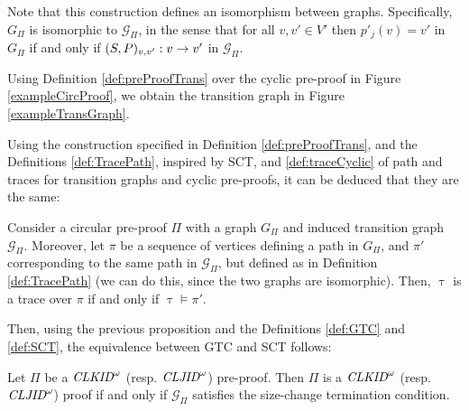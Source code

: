 Note that this construction defines an isomorphism between graphs. Specifically, $G_{\Pi}$ is isomorphic to $\mathcal{G}_{\Pi}$, in the sense that for all $v,v' \in V'$ then $p'_j(v) = v'$ in $G_{\Pi}$ if and only if $(S,P)_{v,v'} : v \to v'$ in $\mathcal{G}_{\Pi}$.




\begin{example}
    Using Definition \ref{def:preProofTrans} over the cyclic pre-proof in Figure \ref{exampleCircProof}, we obtain the transition graph in Figure \ref{exampleTransGraph}. 
\end{example}

Using the construction specified in Definition \ref{def:preProofTrans}, and the Definitions \ref{def:TracePath}, inspired by SCT, and \ref{def:traceCyclic} of path and traces for transition graphs and cyclic pre-proofs, it can be deduced that they are the same:


\begin{proposition}
Consider a circular pre-proof $\Pi$ with a graph $G_{\Pi}$ and induced transition graph $\mathcal{G}_{\Pi}$. Moreover, let $\pi$ be a sequence of vertices defining a path in $G_{\Pi}$, and $\pi'$ corresponding to the same path in $\mathcal{G}_{\Pi}$, but defined as in Definition \ref{def:TracePath} (we can do this, since the two graphs are isomorphic). Then, $\uptau$ is a trace over $\pi$ if and only if $\uptau \models \pi'$.
\end{proposition}

Then, using the previous proposition and the Definitions \ref{def:GTC} and \ref{def:SCT}, the equivalence between GTC and SCT follows:

\begin{proposition}\label{prop:GTC-SCT}
Let $\Pi$ be a $\textit{CLKID}^\omega$ (resp. $\textit{CLJID}^\omega$) pre-proof. Then $\Pi$ is a $\textit{CLKID}^\omega$ (resp. $\textit{CLJID}^\omega$) proof if and only if $\mathcal{G}_{\Pi}$ satisfies the size-change termination condition.
\end{proposition}